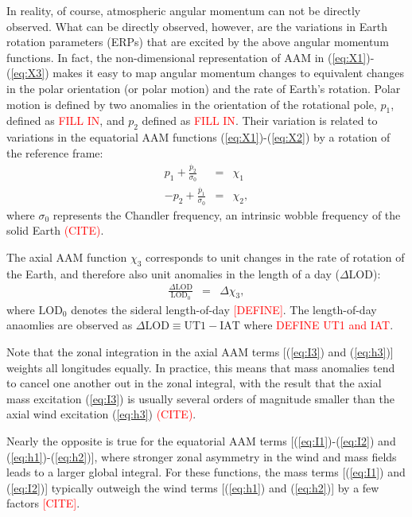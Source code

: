 \documentclass[draft,jgrga]{agutex}
\begin{document}
\begin{article}
In reality, of course, atmospheric angular momentum can not be directly observed.
What can be directly observed, however, are the variations in Earth rotation parameters (ERPs) that are excited by the above angular momentum functions.
In fact, the non-dimensional representation of AAM in (\ref{eq:X1})-(\ref{eq:X3}) makes it easy to map angular momentum changes to equivalent changes in the polar orientation (or polar motion) and the rate of Earth's rotation. 
Polar motion is defined by two anomalies in the orientation of the rotational pole, $p_1$, defined as \textcolor{red}{FILL IN}, and $p_2$ defined as \textcolor{red}{FILL IN}.  
Their variation is related to variations in the equatorial AAM functions (\ref{eq:X1})-(\ref{eq:X2})  by a rotation of the reference frame:
\begin{eqnarray}
  p_1 + \frac{\dot{p_2}}{\sigma_0} &=& \chi_1 \\
  -p_2 + \frac{\dot{p_1}}{\sigma_0} &=& \chi_2,
\label{eq:X12_to_PM}
\end{eqnarray}
where $\sigma_0$ represents the Chandler frequency, an intrinsic wobble frequency of the solid Earth \textcolor{red}{(CITE)}.

The axial AAM function $\chi_3$ corresponds to unit changes in the rate of rotation of the Earth, and therefore also unit anomalies in the length of a day ($\Delta$LOD):
\begin{eqnarray}
\frac{\Delta \text{LOD}}{ \text{LOD}_0 } &=& \Delta \chi_3,
\end{eqnarray}
where $\text{LOD}_0$ denotes the sideral length-of-day \textcolor{red}{[DEFINE]}.  The length-of-day anaomlies are observed as $\Delta \text{LOD}  \equiv \text{UT1} - \text{IAT}$ where \textcolor{red}{DEFINE UT1 and IAT}.


Note that the zonal integration in the axial AAM terms [(\ref{eq:I3}) and (\ref{eq:h3})] weights all longitudes equally.
In practice, this means that mass anomalies tend to cancel one another out in the zonal integral, with the result that the axial mass excitation (\ref{eq:I3}) is usually several orders of magnitude smaller than the axial wind excitation (\ref{eq:h3}) \textcolor{red}{(CITE)}.

Nearly the opposite is true for the equatorial AAM terms [(\ref{eq:I1})-(\ref{eq:I2}) and (\ref{eq:h1})-(\ref{eq:h2})], where stronger zonal asymmetry in the wind and mass fields leads to a larger global integral.
For these functions, the mass terms [(\ref{eq:I1}) and (\ref{eq:I2})] typically outweigh the wind terms [(\ref{eq:h1}) and (\ref{eq:h2})] by a few factors \textcolor{red}{[CITE]}.



\end{article}
\end{document}
